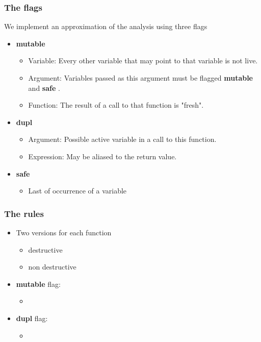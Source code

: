 \documentclass{beamer}
\newcommand{\bang}{\textbf{mutable }}
\newcommand{\safe}{\textbf{safe }}
\begin{document}
\begin{frame}
\frametitle{The flags}
We implement an approximation of the analysis using three flags
\begin{itemize}
\itemsep1.5em
\item \bang
\begin{itemize}
\item Variable: Every other variable that may point to that variable is not live.
\item Argument: Variables passed as this argument must be flagged \bang and \safe.
\item Function: The result of a call to that function is "fresh".
\end{itemize}
\item \textbf{dupl}
\begin{itemize}
\item Argument: Possible active variable in a call to this function.
\item Expression: May be aliased to the return value.
\end{itemize}
\item \textbf{safe}
\begin{itemize}
\item Last of occurrence of a variable
\end{itemize}
\end{itemize}

\end{frame}


\begin{frame}
\frametitle{The rules}
\begin{itemize}
\itemsep1em
\item Two versions for each function
\begin{itemize}
\item destructive
\item non destructive
\end{itemize}
\item \bang flag:
\begin{itemize}
\itemsep0em
\item 
\end{itemize}
\item \textbf{dupl} flag:
\begin{itemize}
\itemsep0em
\item 
\end{itemize}
\end{itemize}
\end{frame}
\end{document}
